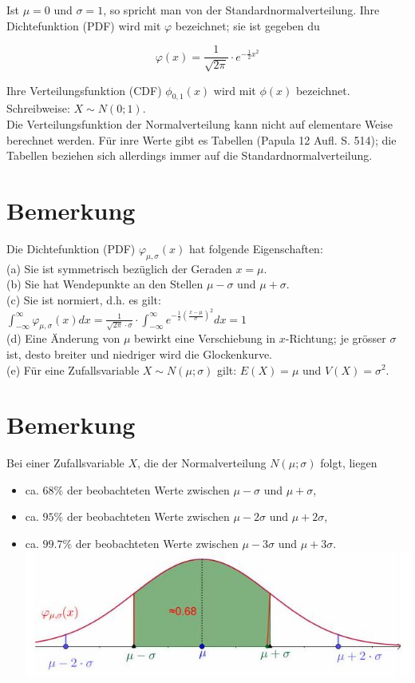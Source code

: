 \documentclass[10pt]{article}
\begin{document}
Ist $\mu=0$ und $\sigma=1$, so spricht man von der Standardnormalverteilung. Ihre Dichtefunktion (PDF) wird mit $\varphi$ bezeichnet; sie ist gegeben du

$$
\varphi(x)=\frac{1}{\sqrt{2 \pi}} \cdot e^{-\frac{1}{2} x^{2}}
$$

Ihre Verteilungsfunktion (CDF) $\phi_{0,1}(x)$ wird mit $\phi(x)$ bezeichnet. Schreibweise: $X \sim N(0 ; 1)$.\\
Die Verteilungsfunktion der Normalverteilung kann nicht auf elementare Weise berechnet werden. Für inre Werte gibt es Tabellen (Papula 12 Aufl. S. 514); die Tabellen beziehen sich allerdings immer auf die Standardnormalverteilung.

\section*{Bemerkung}
Die Dichtefunktion (PDF) $\varphi_{\mu, \sigma}(x)$ hat folgende Eigenschaften:\\
(a) Sie ist symmetrisch bezüglich der Geraden $x=\mu$.\\
(b) Sie hat Wendepunkte an den Stellen $\mu-\sigma$ und $\mu+\sigma$.\\
(c) Sie ist normiert, d.h. es gilt:\\
$\int_{-\infty}^{\infty} \varphi_{\mu, \sigma}(x) d x=\frac{1}{\sqrt{2 \pi} \cdot \sigma} \cdot \int_{-\infty}^{\infty} e^{-\frac{1}{2}\left(\frac{x-\mu}{\sigma}\right)^{2}} d x=1$\\
(d) Eine Änderung von $\mu$ bewirkt eine Verschiebung in $x$-Richtung; je grösser $\sigma$ ist, desto breiter und niedriger wird die Glockenkurve.\\
(e) Für eine Zufallsvariable $X \sim N(\mu ; \sigma)$ gilt: $E(X)=\mu$ und $V(X)=\sigma^{2}$.

\section*{Bemerkung}
Bei einer Zufallsvariable $X$, die der Normalverteilung $N(\mu ; \sigma)$ folgt, liegen

\begin{itemize}
  \item ca. $68 \%$ der beobachteten Werte zwischen $\mu-\sigma$ und $\mu+\sigma$,
  \item ca. $95 \%$ der beobachteten Werte zwischen $\mu-2 \sigma$ und $\mu+2 \sigma$,
  \item ca. $99.7 \%$ der beobachteten Werte zwischen $\mu-3 \sigma$ und $\mu+3 \sigma$.\\
\includegraphics[width=\linewidth]{images/2025_01_02_c6e65a99bfeab7c89599g-4}
\end{itemize}
\end{document}
